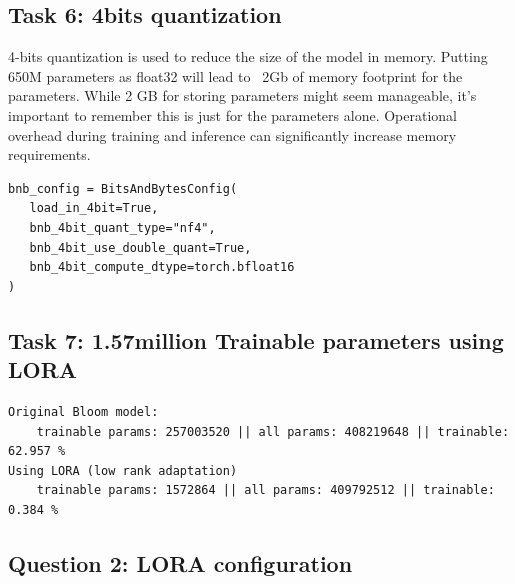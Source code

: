 \documentclass[a4paper]{article}
\begin{document}
\subsection*{Task 6: 4bits quantization}
4-bits quantization is used to reduce the size of the model in memory.
Putting 650M parameters as float32 will lead to ~2Gb of memory footprint for the parameters.
While 2 GB for storing parameters might seem manageable, it's important to remember this is just for the parameters alone.
Operational overhead during training and inference can significantly increase memory requirements.

\begin{verbatim}
bnb_config = BitsAndBytesConfig(
   load_in_4bit=True,
   bnb_4bit_quant_type="nf4",
   bnb_4bit_use_double_quant=True,
   bnb_4bit_compute_dtype=torch.bfloat16
)
\end{verbatim}

\subsection*{Task 7: 1.57million Trainable parameters using LORA}
\begin{verbatim}
Original Bloom model:
    trainable params: 257003520 || all params: 408219648 || trainable: 62.957 %
Using LORA (low rank adaptation)
    trainable params: 1572864 || all params: 409792512 || trainable: 0.384 %
\end{verbatim}


\subsection*{Question 2: LORA configuration}


\end{document}
